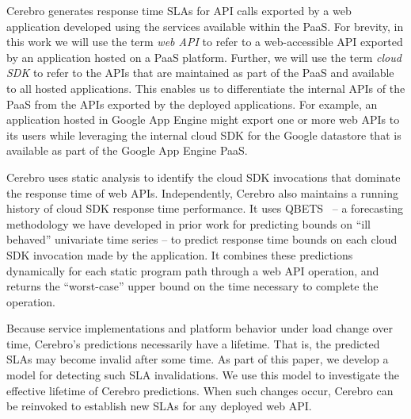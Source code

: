 Cerebro generates response time SLAs for API calls exported by a web
application
developed using the services available within the PaaS.  For brevity, in this work
we will use the
term \textit{web API} to refer to a web-accessible API exported by an
application hosted on a PaaS platform. Further, 
we will use the term \textit{cloud
SDK} to refer to the APIs that are maintained as part of the PaaS and
available to all hosted applications. This enables us to
differentiate the internal APIs of the PaaS from the 
APIs exported by the deployed applications.   
For example, an application hosted in Google App Engine might export one or
more web APIs to its users while leveraging the internal cloud SDK for the
Google datastore that is available as part of the Google App Engine PaaS.

Cerebro uses static analysis to identify the cloud SDK invocations
that dominate the response time of web APIs.  Independently,
Cerebro also maintains a running history of cloud SDK response time 
performance.  It uses
QBETS~\cite{Nurmi:2007:QQB:1791551.1791556} -- a forecasting methodology
we have developed in prior work for predicting bounds on ``ill behaved''   
univariate time series -- to predict response time bounds on each cloud SDK
invocation made by the application.  It combines these predictions dynamically
for each static program path through a web API operation,
and returns the ``worst-case''
upper bound on the time necessary to 
complete the operation.


Because service implementations and platform behavior under load change over time,
Cerebro's predictions necessarily have a lifetime. That is, the predicted SLAs may
become invalid after some time.  
As part of this paper, we develop a model for detecting such SLA invalidations. 
We use this model to investigate
the effective lifetime of Cerebro predictions. When such changes occur,
Cerebro can be reinvoked to establish new SLAs for any deployed web API.  %


